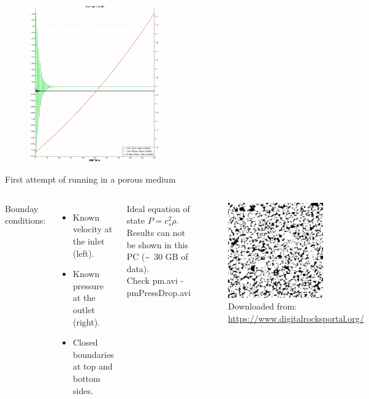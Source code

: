 \documentclass{beamer}
\begin{document}
	\begin{frame}
		\begin{figure}
			\centering
			\includegraphics[width=0.5\textwidth]{pics/globalDenBox.png}
		\end{figure}
	\end{frame}
	
	
	\begin{frame}{First attempt of running in a porous medium}
		\begin{columns}
			\column{0.5\textwidth}
			Bounday conditions:
			\begin{itemize}
				\item Known velocity at the inlet (left).
				\item Known pressure at the outlet (right).
				\item Closed boundaries at top and bottom sides. 
			\end{itemize}
			
			Ideal equation of state $P = c^2_s \rho$.\\
			
			Results can not be shown in this PC (\~~30 GB of data).\\
			Check pm.avi - pmPressDrop.avi
			\column{0.5\textwidth}
			\begin{figure}
				\centering
				\includegraphics[width=0.7\textwidth]{pics/porousMedia.jpg}
				\caption[]{{\small Downloaded from: \href{https://www.digitalrocksportal.org/}{https://www.digitalrocksportal.org/}}}   
			\end{figure}
		\end{columns}
	\end{frame}
\end{document}
